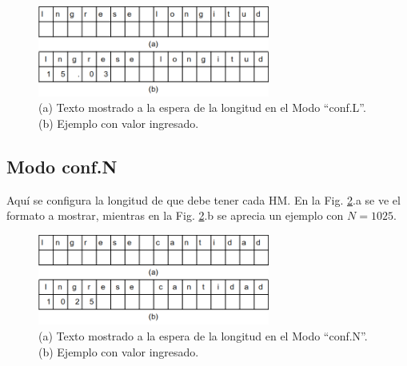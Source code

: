 \documentclass[main_conf.tex]{subfiles}
\begin{document}
\begin{figure}[!t]
  \centering
  \includegraphics[width=3.0in]{../img/modo/Conf_L.png}
  \caption{(a) Texto mostrado a la espera de la longitud en el Modo “conf.L”.
           (b) Ejemplo con valor ingresado.
  }
  \label{Modo_Conf_L}
\end{figure}

\subsection{Modo conf.N}
Aquí se configura la longitud de que debe tener cada HM.
En la Fig. \ref{Modo_Conf_N}.a se ve el formato a mostrar,
mientras en la Fig. \ref{Modo_Conf_N}.b se aprecia un
ejemplo con $N = 1025$.

\begin{figure}[!t]
  \centering
  \includegraphics[width=3.0in]{../img/modo/Conf_N.png}
  \caption{(a) Texto mostrado a la espera de la longitud en el Modo “conf.N”.
           (b) Ejemplo con valor ingresado.
  }
  \label{Modo_Conf_N}
\end{figure}
\end{document}
